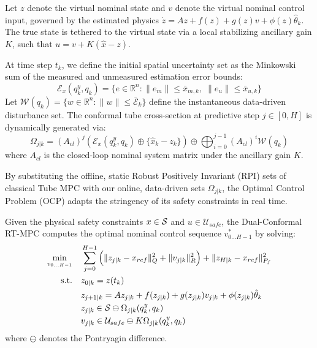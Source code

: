 \documentclass[letterpaper, 10 pt, conference]{ieeeconf}  %
\begin{document}
Let $z$ denote the virtual nominal state and $v$ denote the virtual nominal control input, governed by the estimated physics $\dot{z} = A z + f(z) + g(z)v + \phi(z)\hat{\theta}_k$. The true state is tethered to the virtual state via a local stabilizing ancillary gain $K$, such that $u = v + K(\hat{x} - z)$.

\begin{definition}
At time step $t_k$, we define the initial spatial uncertainty set as the Minkowski sum of the measured and unmeasured estimation error bounds:
\begin{equation}
    \mathcal{E}_x(q^y_k, q_k) = \{ e \in \mathbb{R}^n : \|e_m\| \le \bar{x}_{m,k}, \; \|e_u\| \le \bar{x}_{u,k} \}
\end{equation}
Let $\mathcal{W}(q_k) = \{ w \in \mathbb{R}^n : \|w\| \le \bar{\mathcal{E}}_k \}$ define the instantaneous data-driven disturbance set. The conformal tube cross-section at predictive step $j \in [0, H]$ is dynamically generated via:
\begin{equation}
    \Omega_{j|k} = (A_{cl})^j \left( \mathcal{E}_x(q^y_k, q_k) \oplus \{ \hat{x}_k - z_k \} \right) \oplus \bigoplus_{i=0}^{j-1} (A_{cl})^i \mathcal{W}(q_k)
\end{equation}
where $A_{cl}$ is the closed-loop nominal system matrix under the ancillary gain $K$.
\end{definition}

By substituting the offline, static Robust Positively Invariant (RPI) sets of classical Tube MPC with our online, data-driven sets $\Omega_{j|k}$, the Optimal Control Problem (OCP) adapts the stringency of its safety constraints in real time.

\begin{theorem}
Given the physical safety constraints $x \in \mathcal{S}$ and $u \in \mathcal{U}_{safe}$, the Dual-Conformal RT-MPC computes the optimal nominal control sequence $v^*_{0\dots H-1}$ by solving:
\begin{align}
    \min_{v_{0\dots H-1}} \quad & \sum_{j=0}^{H-1} \Big( \|z_{j|k} - x_{ref}\|^2_Q + \|v_{j|k}\|^2_R \Big) + \|z_{H|k} - x_{ref}\|^2_{P_f} \\
    \text{s.t.} \quad & z_{0|k} = z(t_k) \nonumber \\
    & z_{j+1|k} = A z_{j|k} + f(z_{j|k}) + g(z_{j|k})v_{j|k} + \phi(z_{j|k})\hat{\theta}_k \nonumber \\
    & z_{j|k} \in \mathcal{S} \ominus \Omega_{j|k}(q^y_k, q_k) \label{eq:state_tighten} \\
    & v_{j|k} \in \mathcal{U}_{safe} \ominus K \Omega_{j|k}(q^y_k, q_k) \label{eq:input_tighten}
\end{align}
where $\ominus$ denotes the Pontryagin difference. 
\end{theorem}
\end{document}

